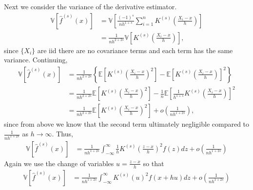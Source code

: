 \documentclass[12pt]{article}
\newcommand{\E}{\mathbb{E}}
\newcommand{\V}{\mathbb{V}}
\begin{document}
Next we consider the variance of the derivative estimator.
\begin{align*}
\V[\hat f^{(s)}(x)] &= \V\left[\frac{(-1)^s}{nh^{1+s}}\sum_{i=1}^n K^{(s)}\left(\frac{X_i - x}{h}\right)\right]\\
&=\frac{1}{nh^{2+2s}}\V\left[K^{(s)}\left(\frac{X_i - x}{h}\right)\right],
\end{align*}
since $\{X_i\}$ are iid there are no covariance terms and each term has the same variance. Continuing,
\begin{align*}
\V[\hat f^{(s)}(x)] &=\frac{1}{nh^{2+2s}} \left\{\E\left[K^{(s)}\left(\frac{X_i - x}{h}\right)^2\right] - \E\left[K^{(s)}\left(\frac{X_i - x}{h}\right)\right]^2 \right\}\\
&=\frac{1}{nh^{2+2s}} \E\left[K^{(s)}\left(\frac{X_i - x}{h}\right)^2\right] - \frac{1}{n} \E\left[\frac{1}{h^{1+s}}K^{(s)}\left(\frac{X_i - x}{h}\right)\right]^2 \\
&=\frac{1}{nh^{2+2s}} \E\left[K^{(s)}\left(\frac{X_i - x}{h}\right)^2\right] + o\left(\frac{1}{nh^{1+2s}}\right),
\end{align*}
since from above we know that the second term ultimately negligible compared to $\frac{1}{nh^{1+2s}}$ as $h \to \infty$. Thus,
\begin{align*}
\V[\hat f^{(s)}(x)] &=\frac{1}{nh^{1+2s}} \int_{-\infty}^{\infty}\frac{1}{h}K^{(s)}\left(\frac{z- x}{h}\right)^2 f(z) dz + o\left(\frac{1}{nh^{1+2s}}\right)
\end{align*}
Again we use the change of variables $u = \frac{z - x}{h}$ so that
\begin{align*}
\V[\hat f^{(s)}(x)] &=\frac{1}{nh^{1+2s}} \int_{-\infty}^{\infty}K^{(s)}(u)^2 f(x+hu) dz + o\left(\frac{1}{nh^{1+2s}}\right)
\end{align*}
\end{document}
